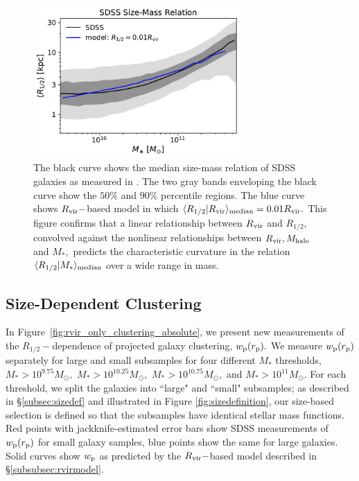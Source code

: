 \documentclass[usenatbib,usegraphicx,letterpaper]{mn2e}
\newcommand{\rhalf}{R_{1/2}}
\newcommand{\mstar}{M_{\ast}}
\newcommand{\mhalo}{M_{\rm halo}}
\newcommand{\rvir}{R_{\rm vir}}
\newcommand{\rproj}{r_{\rm p}}
\newcommand{\wproj}{w_{\rm p}}
\newcommand{\median}[2]{\langle{#1}\vert{#2}\rangle_{\rm median}}
\newcommand{\msun}{M_\odot}
\begin{document}
\begin{figure}
\centering
\includegraphics[width=8cm]{FIGS/rvir_only_rhalf_vs_mstar_sham_model.pdf}
\caption{
The black curve shows the median size-mass relation of SDSS galaxies as measured in \citet{meert_etal15}. The two gray bands enveloping the black curve show the $50\%$ and $90\%$ percentile regions. The blue curve shows $\rvir-$based model in which $\median{\rhalf}{\rvir}=0.01\rvir.$ This figure confirms that a linear relationship between $\rvir$ and $\rhalf,$ convolved against the nonlinear relationships between $\rvir, \mhalo$ and $\mstar,$  predicts the characteristic curvature in the relation $\median{\rhalf}{\mstar}$ over a wide range in mass.
}
\label{fig:scatter_plot}
\end{figure}

\subsection{Size-Dependent Clustering}
\label{subsec:clustering_results}

In Figure~\ref{fig:rvir_only_clustering_absolute}, we present new measurements of the $\rhalf-$dependence of projected galaxy clustering, $\wproj(\rproj).$ We measure $\wproj(\rproj)$ separately for large and small subsamples for four different $\mstar$ thresholds, $\mstar>10^{9.75}\msun,$ $\mstar>10^{10.25}\msun,$ $\mstar>10^{10.75}\msun,$ and $\mstar>10^{11}\msun.$ For each threshold, we split the galaxies into ``large" and ``small" subsamples; as described in \S\ref{subsec:sizedef} and illustrated in Figure \ref{fig:sizedefinition}, our size-based selection is defined so that the subsamples have identical stellar mass functions. Red points with jackknife-estimated error bars show SDSS measurements of $\wproj(\rproj)$ for small galaxy samples, blue points show the same for large galaxies. Solid curves show $\wproj$ as predicted by the $\rvir-$based model described in \S\ref{subsubsec:rvirmodel}. 
\end{document}
